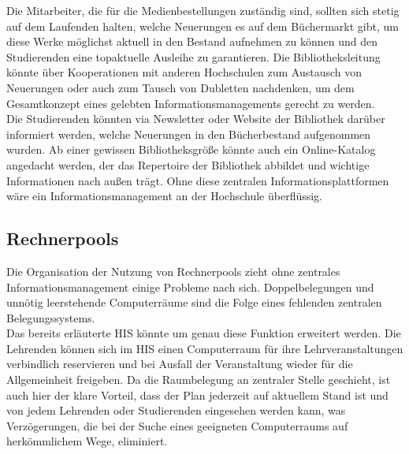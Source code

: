 Die Mitarbeiter, die für die Medienbestellungen zuständig sind, sollten sich stetig auf dem Laufenden halten, welche Neuerungen es auf dem Büchermarkt gibt, um diese Werke möglichst aktuell in den Bestand aufnehmen zu können und den Studierenden eine topaktuelle Ausleihe zu garantieren. Die Bibliotheksleitung könnte über Kooperationen mit anderen Hochschulen zum Austausch von Neuerungen oder auch zum Tausch von Dubletten nachdenken, um dem Gesamtkonzept eines gelebten Informationsmanagements gerecht zu werden.\\

Die Studierenden könnten via Newsletter oder Website der Bibliothek darüber informiert werden, welche Neuerungen in den Bücherbestand aufgenommen wurden. Ab einer gewissen Bibliotheksgröße könnte auch ein Online-Katalog angedacht werden, der das Repertoire der Bibliothek abbildet und wichtige Informationen nach außen trägt. Ohne diese zentralen Informationsplattformen wäre ein Informationsmanagement an der Hochschule überflüssig.\\

\subsection{Rechnerpools}
Die Organisation der Nutzung von Rechnerpools zieht ohne zentrales Informationsmanagement einige Probleme nach sich. Doppelbelegungen und unnötig leerstehende Computerräume sind die Folge eines fehlenden zentralen Belegungssystems.\\

Das bereits erläuterte HIS könnte um genau diese Funktion erweitert werden. Die Lehrenden können sich im HIS einen Computerraum für ihre Lehrveranstaltungen verbindlich reservieren und bei Ausfall der Veranstaltung wieder für die Allgemeinheit freigeben. Da die Raumbelegung an zentraler Stelle geschieht, ist auch hier der klare Vorteil, dass der Plan jederzeit auf aktuellem Stand ist und von jedem Lehrenden oder Studierenden eingesehen werden kann, was Verzögerungen, die bei der Suche eines geeigneten Computerraums auf herkömmlichem Wege, eliminiert.
